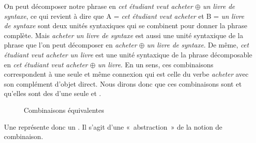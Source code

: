 On peut décomposer notre phrase en \textit{cet étudiant veut acheter} ${\oplus}$ \textit{un livre de syntaxe}, ce qui revient à dire que A = \textit{cet étudiant veut acheter} et B = \textit{un livre de syntaxe} sont deux unités syntaxiques qui se combinent pour donner la phrase complète. Mais \textit{acheter un livre de syntaxe} est aussi une unité syntaxique de la phrase que l’on peut décomposer en \textit{acheter} ${\oplus}$ \textit{un livre de syntaxe}. De même, \textit{cet étudiant veut acheter un livre} est une unité syntaxique de la phrase décomposable en \textit{cet étudiant veut acheter} ${\oplus}$ \textit{un livre}. En un sens, ces combinaisons correspondent à une seule et même connexion qui est celle du verbe \textit{acheter} avec son complément d’objet direct. Nous dirons donc que ces combinaisons sont  et qu’elles sont des  d’une seule et . 

\begin{figure}\label{fig:combiequiv}
\caption{Combinaisons équivalentes}
\end{figure}

{Une  représente donc un . Il s’agit d’une «~abstraction~» de la notion de combinaison.}

